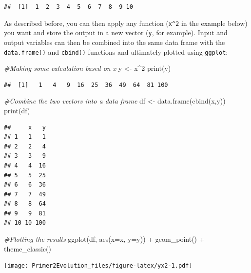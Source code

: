 \documentclass[
]{book}
\newenvironment{Shaded}{\begin{snugshade}}{\end{snugshade}}
\newcommand{\AttributeTok}[1]{\textcolor[rgb]{0.77,0.63,0.00}{#1}}
\newcommand{\CommentTok}[1]{\textcolor[rgb]{0.56,0.35,0.01}{\textit{#1}}}
\newcommand{\DecValTok}[1]{\textcolor[rgb]{0.00,0.00,0.81}{#1}}
\newcommand{\FunctionTok}[1]{\textcolor[rgb]{0.00,0.00,0.00}{#1}}
\newcommand{\NormalTok}[1]{#1}
\newcommand{\OtherTok}[1]{\textcolor[rgb]{0.56,0.35,0.01}{#1}}
\newcommand{\SpecialCharTok}[1]{\textcolor[rgb]{0.00,0.00,0.00}{#1}}
\begin{document}
\begin{verbatim}
##  [1]  1  2  3  4  5  6  7  8  9 10
\end{verbatim}

As described before, you can then apply any function (\texttt{x\^{}2} in the example below) you want and store the output in a new vector (\texttt{y}, for example). Input and output variables can then be combined into the same data frame with the \texttt{data.frame()} and \texttt{cbind()} functions and ultimately plotted using \texttt{ggplot}:

\begin{Shaded}
\begin{Highlighting}[]
\CommentTok{\#Making some calculation based on x}
\NormalTok{y }\OtherTok{\textless{}{-}}\NormalTok{ x}\SpecialCharTok{\^{}}\DecValTok{2}
\FunctionTok{print}\NormalTok{(y)}
\end{Highlighting}
\end{Shaded}

\begin{verbatim}
##  [1]   1   4   9  16  25  36  49  64  81 100
\end{verbatim}

\begin{Shaded}
\begin{Highlighting}[]
\CommentTok{\#Combine the two vectors into a data frame}
\NormalTok{df }\OtherTok{\textless{}{-}} \FunctionTok{data.frame}\NormalTok{(}\FunctionTok{cbind}\NormalTok{(x,y))}
\FunctionTok{print}\NormalTok{(df)}
\end{Highlighting}
\end{Shaded}

\begin{verbatim}
##     x   y
## 1   1   1
## 2   2   4
## 3   3   9
## 4   4  16
## 5   5  25
## 6   6  36
## 7   7  49
## 8   8  64
## 9   9  81
## 10 10 100
\end{verbatim}

\begin{Shaded}
\begin{Highlighting}[]
\CommentTok{\#Plotting the results}
\FunctionTok{ggplot}\NormalTok{(df, }\FunctionTok{aes}\NormalTok{(}\AttributeTok{x=}\NormalTok{x, }\AttributeTok{y=}\NormalTok{y)) }\SpecialCharTok{+}
    \FunctionTok{geom\_point}\NormalTok{() }\SpecialCharTok{+}
    \FunctionTok{theme\_classic}\NormalTok{()}
\end{Highlighting}
\end{Shaded}

\texttt{[image: Primer2Evolution\_files/figure-latex/yx2-1.pdf]}
\end{document}
